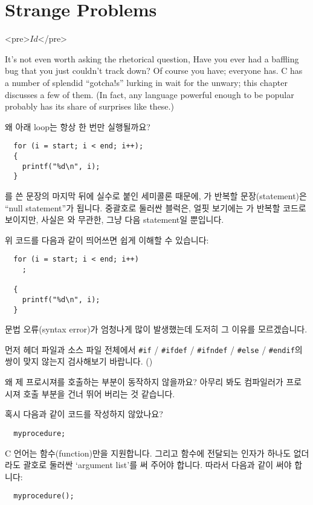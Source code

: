 \chapter{Strange Problems}	\label{chap:sproblem}

\begin{rawhtml}
<pre>$Id$</pre>
\end{rawhtml}

It's not even worth asking the rhetorical question, Have you ever had a
baffling bug that you just couldn't track down?  Of course you have;
everyone has.  C has a number of splendid ``gotcha!s'' lurking in wait for
the unwary;  this chapter discusses a few of them.  (In fact, any language
powerful enough to be popular probably has its share of surprises like these.)

\begin{faq}
	왜 아래 loop는 항상 한 번만 실행될까요?
\begin{verbatim}
  for (i = start; i < end; i++);
  {
    printf("%d\n", i);
  }
\end{verbatim}
\A
	를 쓴 문장의 마지막 뒤에 실수로 붙인 세미콜론 때문에,
        가 반복할 문장(statement)은 ``null statement''가 됩니다.
        중괄호로 둘러싼 블럭은, 얼핏 보기에는 가 반복할 코드로 보이지만,
        사실은 와 무관한, 그냥 다음 statement일 뿐입니다.

\T
	위 코드를 다음과 같이 띄어쓰면 쉽게 이해할 수 있습니다:
\begin{verbatim}
  for (i = start; i < end; i++)
    ;

  {
    printf("%d\n", i);
  }
\end{verbatim}
\end{faq}

\begin{faq}
	문법 오류(syntax error)가 엄청나게 많이 발생했는데 도저히 그
	이유를 모르겠습니다.

\A
	먼저 헤더 파일과 소스 파일 전체에서
	\verb+#if+ / \verb+#ifdef+ / \verb+#ifndef+ / \verb+#else+ / 
        \verb+#endif+의
	쌍이 맞지 않는지 검사해보기 바랍니다.
	()
\end{faq}

\begin{faq}
	왜 제 프로시져를 호출하는 부분이 동작하지 않을까요? 아무리 봐도
	컴파일러가 프로시져 호출 부분을 건너 뛰어 버리는 것 같습니다.

\A
	혹시 다음과 같이 코드를 작성하지 않았나요?
\begin{verbatim}
  myprocedure;
\end{verbatim}
	\noindent
	C 언어는 함수(function)만을 지원합니다.  그리고 함수에 전달되는
	인자가 하나도 없더라도 괄호로 둘러싼 `argument list'를 써 주어야
	합니다.  따라서 다음과 같이 써야 합니다:

\begin{verbatim}
  myprocedure();
\end{verbatim}
\end{faq}

